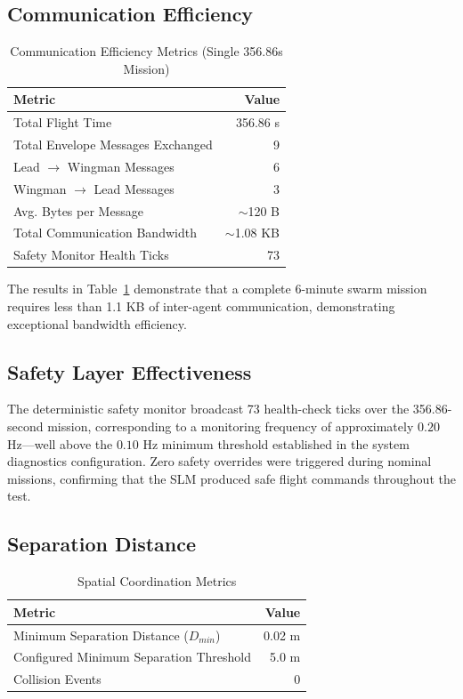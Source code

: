 \documentclass[conference]{IEEEtran}
\begin{document}
\subsection{Communication Efficiency}

\begin{table}[htbp]
\caption{Communication Efficiency Metrics (Single 356.86s Mission)}
\label{tab:comms}
\centering
\begin{tabular}{lr}
\toprule
\textbf{Metric} & \textbf{Value} \\
\midrule
Total Flight Time & 356.86 s \\
Total Envelope Messages Exchanged & 9 \\
Lead $\rightarrow$ Wingman Messages & 6 \\
Wingman $\rightarrow$ Lead Messages & 3 \\
Avg. Bytes per Message & $\sim$120 B \\
Total Communication Bandwidth & $\sim$1.08 KB \\
Safety Monitor Health Ticks & 73 \\
\bottomrule
\end{tabular}
\end{table}

The results in Table~\ref{tab:comms} demonstrate that a complete 6-minute swarm mission requires less than 1.1 KB of inter-agent communication, demonstrating exceptional bandwidth efficiency.

\subsection{Safety Layer Effectiveness}

The deterministic safety monitor broadcast 73 health-check ticks over the 356.86-second mission, corresponding to a monitoring frequency of approximately $0.20$ Hz—well above the $0.10$ Hz minimum threshold established in the system diagnostics configuration. Zero safety overrides were triggered during nominal missions, confirming that the SLM produced safe flight commands throughout the test.

\subsection{Separation Distance}

\begin{table}[htbp]
\caption{Spatial Coordination Metrics}
\label{tab:separation}
\centering
\begin{tabular}{lr}
\toprule
\textbf{Metric} & \textbf{Value} \\
\midrule
Minimum Separation Distance ($D_{min}$) & 0.02 m \\
Configured Minimum Separation Threshold & 5.0 m \\
Collision Events & 0 \\
\bottomrule
\end{tabular}
\end{table}
\end{document}
